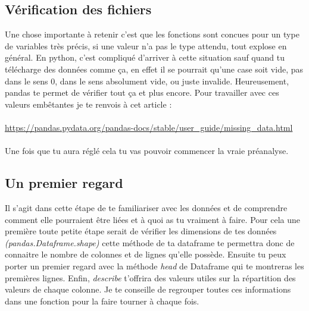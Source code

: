 \documentclass[10pt,a4paper]{book}
\begin{document}
\subsection{Vérification des fichiers}


Une chose importante à retenir c'est que les fonctions sont concues pour un type de variables très précis, si une valeur n'a pas le type attendu, tout explose en général. En python, c'est compliqué d'arriver à cette situation sauf quand tu télécharge des données comme ça, en effet il se pourrait qu'une case soit vide, pas dans le sens 0, dans le sens absolument vide, ou juste invalide. Heureusement, pandas te permet de vérifier tout ça et plus encore. Pour travailler avec ces valeurs embêtantes je te renvois à cet article :
\\\\
\url{https://pandas.pydata.org/pandas-docs/stable/user_guide/missing_data.html}
\\\\
Une fois que tu aura réglé cela tu vas pouvoir commencer la vraie préanalyse.

\subsection{Un premier regard}
Il s'agit dans cette étape de te familiariser avec les données et de comprendre comment elle pourraient être liées et à quoi as tu vraiment à faire. Pour cela une première toute petite étape serait de vérifier les dimensions de tes données \textit{(pandas.Dataframe.shape)} cette méthode de ta dataframe te permettra donc de connaitre le nombre de colonnes et de lignes qu'elle possède. Ensuite tu peux porter un premier regard avec la méthode \textit{head} de Dataframe qui te montreras les premières lignes. Enfin, \textit{describe} t'offrira des valeurs utiles sur la répartition des valeurs de chaque colonne.
Je te conseille de regrouper toutes ces informations dans une fonction pour la faire tourner à chaque fois.
  
\end{document}
